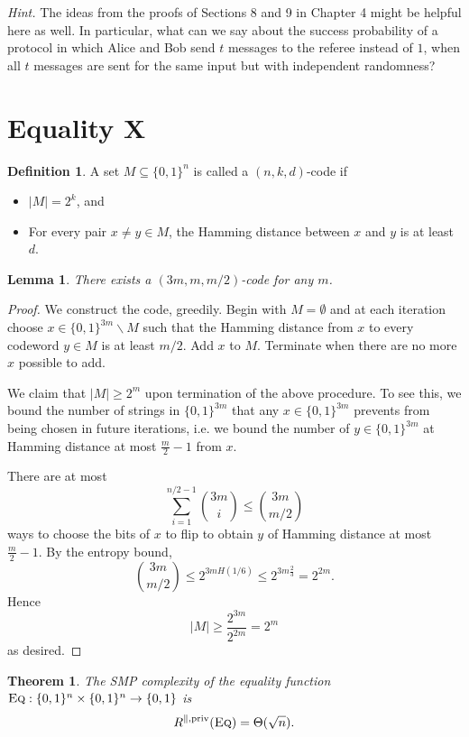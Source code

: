 \documentclass[11pt]{amsart}
\theoremstyle{plain}
\newtheorem{theorem}{Theorem}
\newtheorem{lemma}{Lemma}
\theoremstyle{definition}
\newtheorem{definition}{Definition}
\theoremstyle{plain}
\newcommand{\Eq}{\textsc{Eq}}
\begin{document}
\bigskip
\noindent \emph{Hint.} The ideas from the proofs of Sections 8 and 9 in Chapter 4 might be helpful here as well. In particular, what can we say about the success probability of a protocol in which Alice and Bob send $t$ messages to the referee instead of $1$, when all $t$ messages are sent for the same input but with independent randomness?


\newpage 
\section{Equality X}

\begin{definition}
	A set $M \subseteq \{0,1\}^n$ is called a $(n,k,d)$-code if
	\begin{itemize}
		\item $|M| = 2^k$, and 
		\item For every pair $x\neq y \in M$, the Hamming distance between $x$ and $y$ is at least $d$.
	\end{itemize}
\end{definition}

\begin{lemma}\label{lemma:code}
There exists a $(3m,m,m/2)$-code for any $m$.
\end{lemma}

\begin{proof}
We construct the code, greedily. Begin with $M= \emptyset$ and at each iteration choose $x\in \{0,1\}^{3m}\backslash M$ such that the Hamming distance from $x$ to every codeword $y \in M$ is at least $m/2$. Add $x$ to $M$. Terminate when there are no more $x$ possible to add.

We claim that $|M| \geq 2^m$ upon termination of the above procedure. To see this, we bound the number of strings in $\{0,1\}^{3m}$ that any $x \in \{0,1\}^{3m}$ prevents from being chosen in future iterations, i.e. we bound the number of $y \in \{0,1\}^{3m}$ at Hamming distance at most $\frac{m}{2}-1$ from $x$.

There are at most 
$$\sum_{i=1}^{n/2 - 1} {3m \choose i} \leq {3m \choose m/2}$$
ways to choose the bits of $x$ to flip to obtain $y$ of Hamming distance at most $\frac{m}{2} - 1$. By the entropy bound,
$${3m\choose m/2} \leq 2^{3m H(1/6)} \leq 2^{3m\frac{2}{3}} = 2^{2m}.$$
Hence 
$$|M| \geq \frac{2^{3m}}{2^{2m}} =2^m$$
as desired.
\end{proof}


\begin{theorem}
The SMP complexity of the equality function $\Eq : \{0,1\}^n \times \{0,1\}^n \to \{0,1\}$ is
\[
R^{\parallel,\mathrm{priv}}(\Eq) = \Theta(\sqrt{n}).
\]
\end{theorem}
\end{document}
